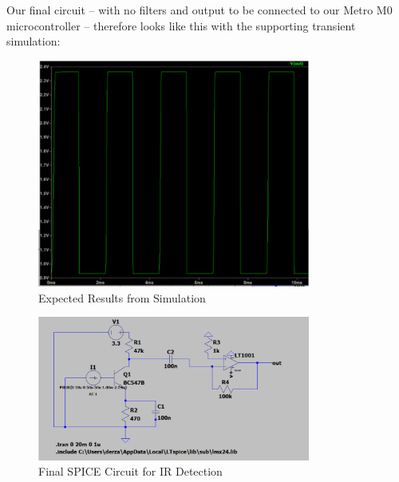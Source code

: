 Our final circuit -- with no filters and output to be connected to our Metro M0 microcontroller -- therefore looks like this with the supporting transient simulation:
\begin{figure}[h]
    \centering
    \includegraphics[width=0.8\textwidth]{subpages/images/ir_expected.png}
    \caption{Expected Results from Simulation}
    \label{fig:expected_results}
\end{figure}
\begin{figure}[h]
    \centering
    \includegraphics[width=0.8\textwidth]{subpages/images/ir_final.png}
    \caption{Final SPICE Circuit for IR Detection}
    \label{fig:final_circuit}
\end{figure}

